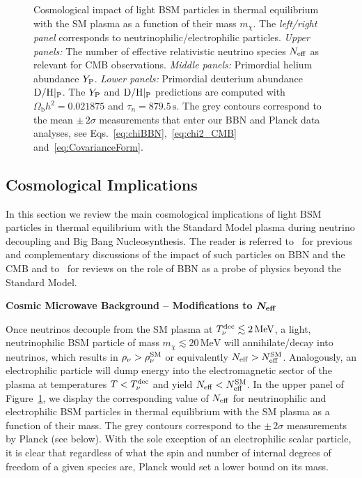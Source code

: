 \documentclass[notitlepage,letterpaper,natbib,aps,prd,onecolumn,amsmath,amsfonts,nofootinbib,preprintnumbers,superscriptaddress,secnumarabic,groupedaddress]{revtex4-1}
\begin{document}
\begin{figure}[t]
    \caption{Cosmological impact of light BSM particles in thermal equilibrium with the SM plasma as a function of their mass $m_\chi$. The \textit{left/right panel} corresponds to neutrinophilic/electrophilic particles. \textit{Upper panels:} The number of effective relativistic neutrino species $N_{\rm eff}$ as relevant for CMB observations. \textit{Middle panels:} Primordial helium abundance $Y_{\rm P}$. \textit{Lower panels:} Primordial deuterium abundance ${\rm D/H}|_{\rm P}$. The $Y_{\rm P}$ and ${\rm D/H}|_{\rm P}$ predictions are computed with $\Omega_\mathrm{b} h^2 = 0.021875$ and $\tau_n = 879.5\,\text{s}$. The grey contours correspond to the mean $\pm \, 2\sigma$ measurements that enter our BBN and Planck data analyses, see Eqs.~\eqref{eq:chiBBN},~\eqref{eq:chi2_CMB}  and~\eqref{eq:CovarianceForm}.}
    \label{fig:Cosmoimply}
\end{figure}


\subsection{Cosmological Implications}\label{sec:earlyUniverse_method}
In this section we review the main cosmological implications of light BSM particles in thermal equilibrium with the Standard Model plasma during neutrino decoupling and Big Bang Nucleosynthesis. The reader is referred to~\cite{Kolb:1986nf,Serpico:2004nm,Boehm:2013jpa,Nollett:2013pwa,Nollett:2014lwa} for previous and complementary discussions of the impact of such particles on BBN and the CMB and to~\cite{Sarkar:1995dd,Iocco:2008va,Pospelov:2010hj} for reviews on the role of BBN as a probe of physics beyond the Standard Model. 

\vspace{0.1cm}
\textbf{Cosmic Microwave Background -- Modifications to $\boldsymbol{N_{\rm eff}}$} 

Once neutrinos decouple from the SM plasma at $T_\nu^{\rm dec} \lesssim 2\,\text{MeV}$, a light, neutrinophilic BSM particle of mass $m_\chi \lesssim 20 \,\text{MeV}$ will annihilate/decay into neutrinos, which results in $\rho_\nu > \rho_\nu^{\rm SM}$ or equivalently $N_{\rm eff} >N_{\rm eff}^{\rm SM}$. Analogously, an electrophilic particle will dump energy into the electromagnetic sector of the plasma at temperatures $T < T_\nu^{\rm dec}$ and yield $N_{\rm eff} < N_{\rm eff}^{\rm SM}$. In the upper panel of Figure~\ref{fig:Cosmoimply}, we display the corresponding value of $N_{\rm eff}$ for neutrinophilic and electrophilic BSM particles in thermal equilibrium with the SM plasma as a function of their mass. The grey contours correspond to the $\pm\,2\sigma$ measurements by Planck (see below). With the sole exception of an electrophilic scalar particle, it is clear that regardless of what the spin and number of internal degrees of freedom of a given species are, Planck would set a lower bound on its mass.
\end{document}
